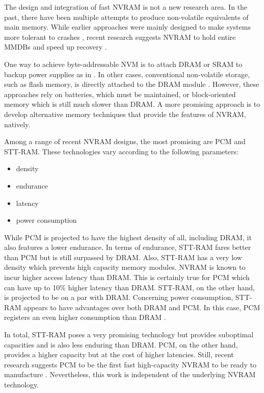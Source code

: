 The design and integration of fast \ac{NVRAM} is not a new research area. In the
past, there have been multiple attempts to produce non-volatile equivalents of
main memory. While earlier approaches were mainly designed to make systems more
tolerant to crashes \cite{molina1992main}, recent research suggests \ac{NVRAM}
to hold entire \acp{MMDB} and speed up recovery \cite{oukid2015instant,
schwalb2016hyrise, andrei2017sap}.

One way to achieve byte-addressable \ac{NVM} is to attach \ac{DRAM} or \ac{SRAM}
to backup power supplies as in \cite{liskov1991replication, wang2002conquest}.
In other cases, conventional non-volatile storage, such as flash memory, is
directly attached to the \ac{DRAM} module \cite{shi2010write, huang2014design,
oe2016feasibility}. However, these approaches rely on batteries, which must be
maintained, or block-oriented memory which is still much slower than DRAM. A
more promising approach is to develop alternative memory techniques that provide
the features of \ac{NVRAM}, natively.

Among a range of recent \ac{NVRAM} designs, the most promising are \ac{PCM} and
\ac{STT-RAM}\cite{zilberberg2013phase, mittal2016survey, jain2017computing}.
These technologies vary according to the following parameters:

\begin{itemize}
    \item density
    \item endurance
    \item latency
    \item power consumption
\end{itemize}

While \ac{PCM} is projected to have the highest density of all, including
\ac{DRAM}, it also features a lower endurance. In terms of endurance,
\ac{STT-RAM} fares better than \ac{PCM} but is still surpassed by \ac{DRAM}.
Also, \ac{STT-RAM} has a very low density which prevents high capacity memory
modules. \ac{NVRAM} is known to incur higher access latency than \ac{DRAM}. This
is certainly true for \ac{PCM} which can have up to 10\% higher latency than \ac{DRAM}.
\ac{STT-RAM}, on the other hand, is projected to be on a par with \ac{DRAM}.
Concerning power consumption, \ac{STT-RAM} appears to have advantages over both
\ac{DRAM} and \ac{PCM}. In this case, \ac{PCM} registers an even higher
consumption than \ac{DRAM} \cite{mittal2016survey}.

In total, \ac{STT-RAM} poses a very promising technology but provides suboptimal
capacities and is also less enduring than \ac{DRAM}. \ac{PCM}, on the other
hand, provides a higher capacity but at the cost of higher latencies. Still,
recent research suggests \ac{PCM} to be the first fast high-capacity \ac{NVRAM}
to be ready to manufacture \cite{zilberberg2013phase, dulloor2014system,
mittal2016survey}. Nevertheless, this work is independent of the underlying
NVRAM technology.

